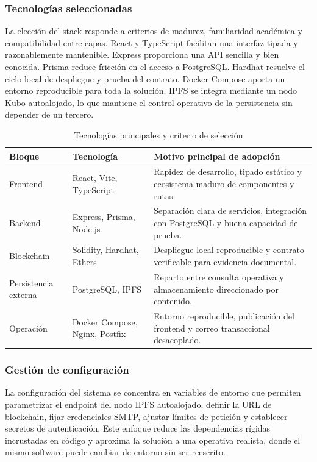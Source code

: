 \documentclass[11pt, a4paper]{article}
\begin{document}
\subsubsection{Tecnologías seleccionadas}

La elección del stack responde a criterios de madurez, familiaridad académica y compatibilidad entre capas. React y TypeScript facilitan una interfaz tipada y razonablemente mantenible. Express proporciona una API sencilla y bien conocida. Prisma reduce fricción en el acceso a PostgreSQL. Hardhat resuelve el ciclo local de despliegue y prueba del contrato. Docker Compose aporta un entorno reproducible para toda la solución. IPFS se integra mediante un nodo Kubo autoalojado, lo que mantiene el control operativo de la persistencia sin depender de un tercero.

\begin{table}[H]
    \centering
    \small
    \begin{tabular}{|p{3.2cm}|p{3.5cm}|p{6.5cm}|}
    \hline
    \textbf{Bloque} & \textbf{Tecnología} & \textbf{Motivo principal de adopción} \\
    \hline
    Frontend & React, Vite, TypeScript & Rapidez de desarrollo, tipado estático y ecosistema maduro de componentes y rutas. \\
    \hline
    Backend & Express, Prisma, Node.js & Separación clara de servicios, integración con PostgreSQL y buena capacidad de prueba. \\
    \hline
    Blockchain & Solidity, Hardhat, Ethers & Despliegue local reproducible y contrato verificable para evidencia documental. \\
    \hline
    Persistencia externa & PostgreSQL, IPFS & Reparto entre consulta operativa y almacenamiento direccionado por contenido. \\
    \hline
    Operación & Docker Compose, Nginx, Postfix & Entorno reproducible, publicación del frontend y correo transaccional desacoplado. \\
    \hline
    \end{tabular}
    \caption{Tecnologías principales y criterio de selección}
    \label{tab:tecnologias-seleccion}
\end{table}

\subsubsection{Gestión de configuración}

La configuración del sistema se concentra en variables de entorno que permiten parametrizar el endpoint del nodo IPFS autoalojado, definir la URL de blockchain, fijar credenciales SMTP, ajustar límites de petición y establecer secretos de autenticación. Este enfoque reduce las dependencias rígidas incrustadas en código y aproxima la solución a una operativa realista, donde el mismo software puede cambiar de entorno sin ser reescrito.
\end{document}
